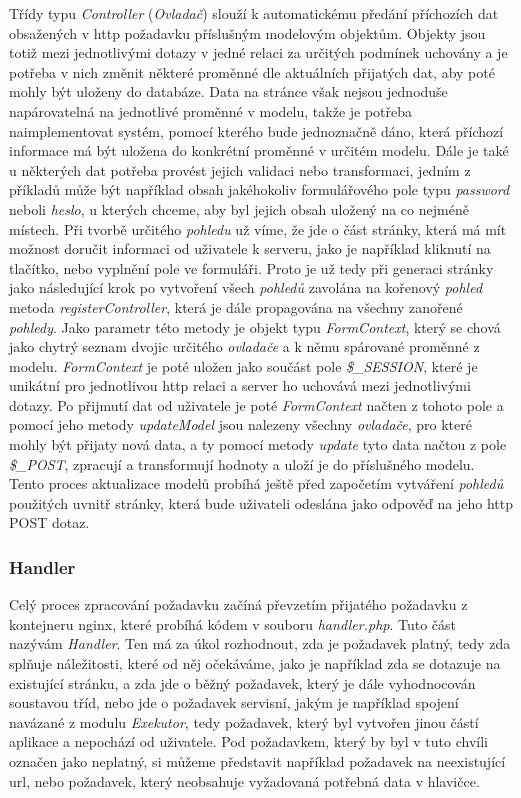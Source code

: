 Třídy typu \emph{Controller} (\emph{Ovladač}) slouží k automatickému předání příchozích dat obsažených v \acrshort{http} požadavku příslušným modelovým objektům. Objekty jsou totiž mezi jednotlivými dotazy v jedné relaci za určitých podmínek uchovány a je potřeba v nich změnit některé proměnné dle aktuálních přijatých dat, aby poté mohly být uloženy do databáze. Data na stránce však nejsou jednoduše napárovatelná na jednotlivé proměnné v modelu, takže je potřeba naimplementovat systém, pomocí kterého bude jednoznačně dáno, která příchozí informace má být uložena do konkrétní proměnné v určitém modelu. Dále je také u některých dat potřeba provést jejich validaci nebo transformaci, jedním z příkladů může být například obsah jakéhokoliv formulářového pole typu \emph{password} neboli \emph{heslo}, u kterých chceme, aby byl jejich obsah uložený na co nejméně místech. Při tvorbě určitého \emph{pohledu} už víme, že jde o část stránky, která má mít možnost doručit informaci od uživatele k serveru, jako je například kliknutí na tlačítko, nebo vyplnění pole ve formuláři. Proto je už tedy při generaci stránky jako následující krok po vytvoření všech \emph{pohledů} zavolána na kořenový \emph{pohled} metoda \emph{registerController}, která je dále propagována na všechny zanořené \emph{pohledy}. Jako parametr této metody je objekt typu \emph{FormContext}, který se chová jako chytrý seznam dvojic určitého \emph{ovladače} a k němu spárované proměnné z modelu. \emph{FormContext} je poté uložen jako součást pole \emph{\$\_SESSION}, které je unikátní pro jednotlivou \acrshort{http} relaci a server ho uchovává mezi jednotlivými dotazy. Po přijmutí dat od uživatele je poté \emph{FormContext} načten z tohoto pole a pomocí jeho metody \emph{updateModel} jsou nalezeny všechny \emph{ovladače}, pro které mohly být přijaty nová data, a ty pomocí metody \emph{update} tyto data načtou z pole \emph{\$\_POST}, zpracují a transformují hodnoty a uloží je do příslušného modelu. Tento proces aktualizace modelů probíhá ještě před započetím vytváření \emph{pohledů} použitých uvnitř stránky, která bude uživateli odeslána jako odpověď na jeho \acrshort{http} POST dotaz.

\subsubsection{Handler}

Celý proces zpracování požadavku začíná převzetím přijatého požadavku z kontejneru \acrshort{nginx}, které probíhá kódem v souboru \emph{handler.php}. Tuto část nazývám \emph{Handler}. Ten má za úkol rozhodnout, zda je požadavek platný, tedy zda splňuje náležitosti, které od něj očekáváme, jako je například zda se dotazuje na existující stránku, a zda jde o běžný požadavek, který je dále vyhodnocován soustavou tříd, nebo jde o požadavek servisní, jakým je například spojení navázané z modulu \emph{Exekutor}, tedy požadavek, který byl vytvořen jinou částí aplikace a nepochází od uživatele. Pod požadavkem, který by byl v tuto chvíli označen jako neplatný, si můžeme představit například požadavek na neexistující \acrshort{url}, nebo požadavek, který neobsahuje vyžadovaná potřebná data v hlavičce.

